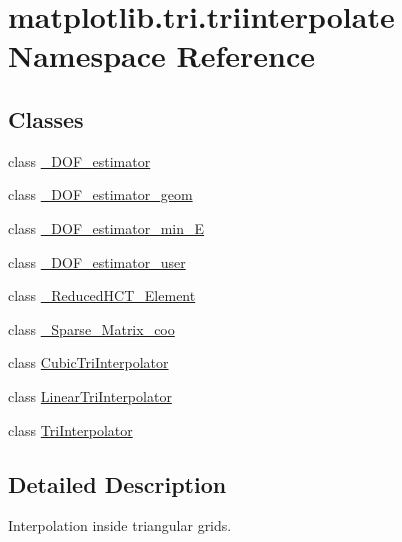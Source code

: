 \hypertarget{namespacematplotlib_1_1tri_1_1triinterpolate}{}\section{matplotlib.\+tri.\+triinterpolate Namespace Reference}
\label{namespacematplotlib_1_1tri_1_1triinterpolate}
\subsection*{Classes}
\begin{DoxyCompactItemize}
\item 
class \hyperlink{classmatplotlib_1_1tri_1_1triinterpolate_1_1__DOF__estimator}{\+\_\+\+D\+O\+F\+\_\+estimator}
\item 
class \hyperlink{classmatplotlib_1_1tri_1_1triinterpolate_1_1__DOF__estimator__geom}{\+\_\+\+D\+O\+F\+\_\+estimator\+\_\+geom}
\item 
class \hyperlink{classmatplotlib_1_1tri_1_1triinterpolate_1_1__DOF__estimator__min__E}{\+\_\+\+D\+O\+F\+\_\+estimator\+\_\+min\+\_\+E}
\item 
class \hyperlink{classmatplotlib_1_1tri_1_1triinterpolate_1_1__DOF__estimator__user}{\+\_\+\+D\+O\+F\+\_\+estimator\+\_\+user}
\item 
class \hyperlink{classmatplotlib_1_1tri_1_1triinterpolate_1_1__ReducedHCT__Element}{\+\_\+\+Reduced\+H\+C\+T\+\_\+\+Element}
\item 
class \hyperlink{classmatplotlib_1_1tri_1_1triinterpolate_1_1__Sparse__Matrix__coo}{\+\_\+\+Sparse\+\_\+\+Matrix\+\_\+coo}
\item 
class \hyperlink{classmatplotlib_1_1tri_1_1triinterpolate_1_1CubicTriInterpolator}{Cubic\+Tri\+Interpolator}
\item 
class \hyperlink{classmatplotlib_1_1tri_1_1triinterpolate_1_1LinearTriInterpolator}{Linear\+Tri\+Interpolator}
\item 
class \hyperlink{classmatplotlib_1_1tri_1_1triinterpolate_1_1TriInterpolator}{Tri\+Interpolator}
\end{DoxyCompactItemize}


\subsection{Detailed Description}
\begin{DoxyVerb}Interpolation inside triangular grids.
\end{DoxyVerb}
 